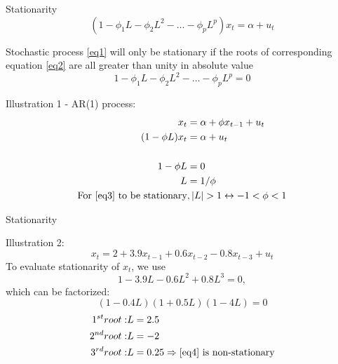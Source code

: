 \documentclass{beamer}
\begin{document}
\begin{frame}{Stationarity}
\vspace{-0.5cm}
\begin{equation} \label{eq1}
(1-\phi_1 L - \phi_2 L^2 - \dots - \phi_p L^p)x_t = \alpha + u_t
\end{equation}

Stochastic process \eqref{eq1} will only be stationary if the roots of corresponding equation \eqref{eq2}  are all greater than unity in absolute value 
\vspace{-0.5cm}
\begin{equation} \label{eq2}
1-\phi_1 L - \phi_2 L^2 - \dots - \phi_p L^p = 0
\end{equation}
\vspace{-0.5cm}
\begin{block}{Illustration 1 - AR(1) process:}
\vspace{-0.5cm}
\begin{align}
\vspace{-0.5cm}
x_t & =  \alpha + \phi x_{t-1} + u_t \label{eq3}  \\ \nonumber
(1-\phi L) x_t & =  \alpha + u_t\\ \nonumber
~ \\ \nonumber
1- \phi L & = 0 \\ \nonumber
L & = 1/\phi \\ \nonumber
\textnormal{For \eqref{eq3} to be stationary} &, \textnormal{$|L|>1 \leftrightarrow -1 < \phi < 1$}
\end{align}
\end{block}

\end{frame}


\begin{frame}{Stationarity}
\begin{block}{Illustration 2:}
\begin{equation}
x_t   = 2 + 3.9 x_{t-1} + 0.6 x_{t-2} - 0.8 x_{t-3} + u_t \label{eq4}
\end{equation}
To evaluate stationarity of $x_t$, we use
\begin{equation*}
1-3.9 L - 0.6 L^2 + 0.8 L^3  = 0 , 
\end{equation*}
which can be factorized:
$$ (1-0.4L)(1+0.5L)(1-4L) =0 $$
\vspace{-0.5cm}
\begin{align} \notag
1^{st} root: & L = 2.5 \\ \notag
2^{nd} root: & L =-2 \\ \notag
3^{rd} root: & L = 0.25 \Rightarrow \textnormal{\eqref{eq4}  is non-stationary}
\end{align}
\end{block}
\end{frame}
\end{document}
